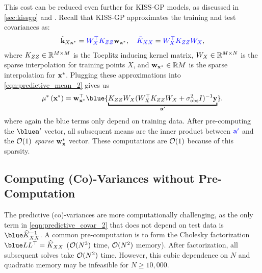 This cost can be reduced even further for KISS-GP models, as discussed in \cref{sec:kissgp} and \citep{wilson2015thoughts}.
Recall that KISS-GP approximates the training and test covariances as:
%
\begin{align*}
  \tilde{\mathbf{k}}_{X \mathbf{x}^*} = {\color{blue} W^\top_{X} K_{Z Z}} \mathbf{w}_{\mathbf{x}^*},
  \quad
  {\color{blue} \tilde{\ensuremath{K}}_{\ensuremath{X}\ensuremath{X}}} = {\color{blue} W^\top_{X} K_{Z Z} W_{X}},
\end{align*}
%
where $K_{ZZ} \in \mathbb{R}^{M \times M}$ is the Toeplitz inducing kernel matrix, $W_{X} \in \mathbb{R}^{M \times N}$ is the sparse interpolation for training points $X$, and $\mathbf{w}_{\mathbf{x}^*} \in \mathbb{R}{M}$ is the sparse interpolation for $\mathbf{x}^*$.
Plugging these approximations into \cref{eqn:predictive_mean_2} gives us
\[
  \meantest{\bxtest} = \bw_{\bxtest}^\top {\blue{\underbracket{\bK_{\bZ\bZ} \bW_{\bX}(\bW_{\bX}^{\top}\bK_{\bZ\bZ}\bW_{\bX} + \sigma_\text{obs}^{2} \bI)^{-1} \by}_{\ba'}}}.
\]
where again the blue terms only depend on training data.
After pre-computing the $\blue \ba'$ vector, all subsequent means are the inner product between $\color{blue} \mathbf{a}'$ and the \emph{$\bigo{1}$ sparse} $\bw_\bxtest$ vector.
These computations are $\bigo{1}$ because of this sparsity.

\subsection{Computing (Co)-Variances without Pre-Computation}

The predictive (co)-variances are more computationally challenging, as the only term in \cref{eqn:predictive_covar_2} that does not depend on test data is $\blue \trainK^{-1}$.
A common pre-computation is to form the Cholesky factorization $\blue \bL \bL^\top = \trainK$ ($\bigo{N^3}$ time, $\bigo{N^2}$ memory).
After factorization, all subsequent solves take $\bigo{N^2}$ time.
However, this cubic dependence on $N$ and quadratic memory may be infeasible for $N \geq 10,\!000$.

